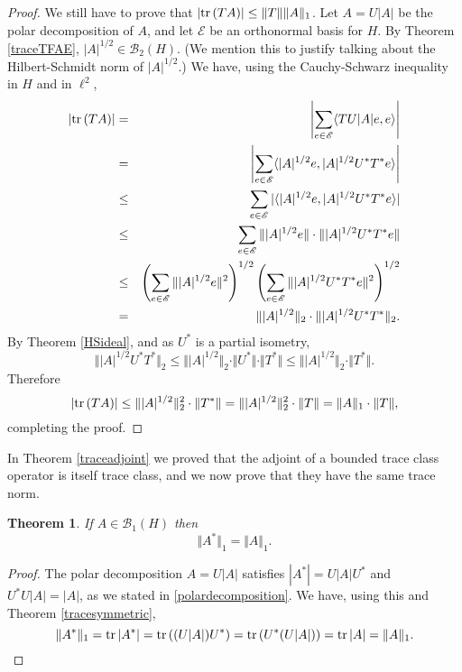 \documentclass{article}
\newcommand{\inner}[2]{\langle #1, #2 \rangle}
\newcommand{\tr}{\ensuremath\mathrm{tr}\,}
\newcommand{\norm}[1]{\Vert #1 \Vert}
\newtheorem{theorem}{Theorem}
\begin{document}
\begin{proof}
We still have to prove that $|\tr(TA)| \leq \norm{T} \norm{A}_1$. 
Let $A=U|A|$ be the polar decomposition of $A$, and let $\mathscr{E}$ be an orthonormal basis for $H$.
By Theorem \ref{traceTFAE}, $|A|^{1/2} \in \mathscr{B}_2(H)$. (We mention this  to justify talking about the Hilbert-Schmidt norm of $|A|^{1/2}$.)
We have, using the Cauchy-Schwarz inequality in $H$ and in $\ell^2$,
\begin{eqnarray*}
|\tr(TA)|&=&\left| \sum_{e \in \mathscr{E}} \inner{TU|A|e}{e} \right|\\
&=&\left| \sum_{e \in \mathscr{E}} \inner{|A|^{1/2}e}{|A|^{1/2}U^*T^*e} \right|\\
&\leq&\sum_{e \in \mathscr{E}} |  \inner{|A|^{1/2}e}{|A|^{1/2}U^*T^*e}  |\\
&\leq&\sum_{e \in \mathscr{E}}   \norm{|A|^{1/2}e} \cdot \norm{|A|^{1/2}U^*T^*e}\\
&\leq&\left( \sum_{e \in \mathscr{E}}   \norm{|A|^{1/2}e}^2 \right)^{1/2} \left( \sum_{e \in \mathscr{E}}  \norm{|A|^{1/2}U^*T^*e}^2 \right)^{1/2}\\
&=&\norm{|A|^{1/2}}_2 \cdot \norm{|A|^{1/2}U^* T^*}_2.
\end{eqnarray*}
By Theorem \ref{HSideal}, and as $U^*$ is a partial isometry,
\[
 \norm{|A|^{1/2}U^* T^*}_2 \leq \norm{|A|^{1/2}}_2 \cdot \norm{U^*} \cdot \norm{T^*} \leq \norm{|A|^{1/2}}_2 \cdot \norm{T^*}.
\]
Therefore
\[
|\tr(TA)| \leq \norm{|A|^{1/2}}_2^2 \cdot \norm{T^*}=\norm{|A|^{1/2}}_2^2 \cdot \norm{T}= \norm{A}_1 \cdot \norm{T},
\]
completing the proof.
\end{proof}



In Theorem \ref{traceadjoint} we proved that the adjoint of a bounded trace class operator is itself trace class, and we now prove that they have the same trace norm.

\begin{theorem}
If $A \in \mathscr{B}_1(H)$ then 
\[
\norm{A^*}_1 = \norm{A}_1.
\]
\label{adjointtracenorm}
\end{theorem}
\begin{proof}
The polar decomposition $A=U|A|$ satisfies
$|A^*|=U|A|U^*$ and $U^*U|A|=|A|$, as we stated in \eqref{polardecomposition}. 
We have, using this and Theorem \ref{tracesymmetric},
\[
\norm{A^*}_1 = \tr |A^*| = \tr ((U|A|)U^*) = \tr(U^*(U|A|)) = \tr |A| = \norm{A}_1.
\]
\end{proof}
\end{document}
